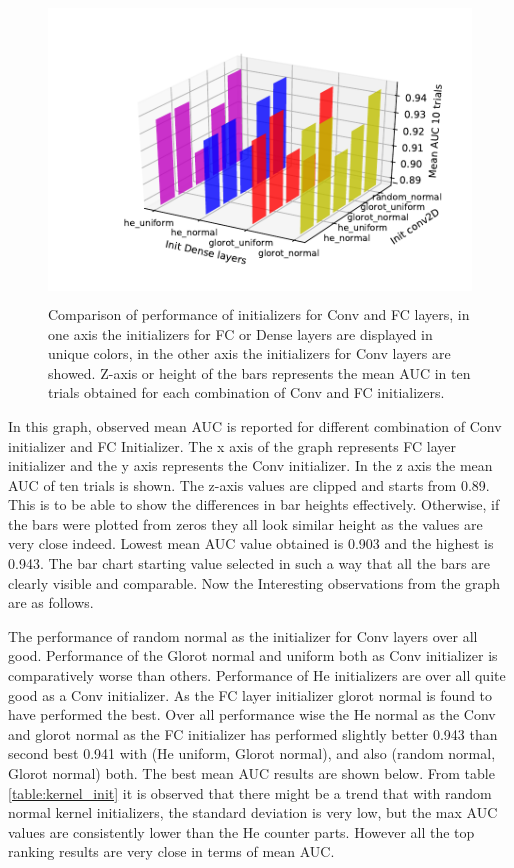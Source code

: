 \begin{figure}[ht]
\centering
\includegraphics[height= 8cm]{images/contrastive/3DbarGraph}
\caption{Comparison of performance of initializers for Conv and FC layers, in one axis the initializers for FC or Dense layers are displayed in unique colors, in the other axis the initializers for Conv layers are showed. Z-axis or 
height of the bars represents the mean AUC in ten trials obtained for each combination of Conv and FC initializers.}
\label{fig:3DbarGraph_initialization}
\end{figure}
In this graph, observed mean AUC is reported for different combination of Conv initializer and FC Initializer. The x axis of the graph represents FC layer initializer 
and the y axis represents the Conv initializer. In the z axis the mean AUC of ten trials is shown. The z-axis values are clipped and starts from 0.89. This is 
to be able to show the differences in bar heights effectively. Otherwise, if the bars were plotted from zeros they all look similar height as the values are very close indeed.
Lowest mean AUC value obtained is 0.903 and the highest is 0.943. The bar chart starting value selected in such a way that all the bars are clearly visible and comparable.
Now the Interesting observations from the graph are as follows.

The performance of random normal as the initializer for Conv layers over all good. Performance of the Glorot normal and uniform both as Conv initializer is comparatively worse than others.
Performance of He initializers are over all quite good as a Conv initializer. 
As the FC layer initializer glorot normal is found to have performed the best.
Over all performance wise the He normal as the Conv and glorot normal as the FC initializer has performed slightly better 0.943 than second best 0.941 with 
(He uniform, Glorot normal), and also (random normal, Glorot normal) both. The best mean AUC results are shown below.  
From table \ref{table:kernel_init} it is observed that there might be a trend that with random normal kernel initializers, the standard deviation is very low, but the 
 max AUC values are consistently lower than the He counter parts. However all the top ranking results are very close in terms of mean AUC.

